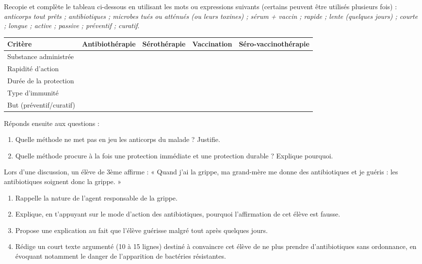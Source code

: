 \documentclass[11pt]{article}
\begin{document}
\begin{exercice}
Recopie et complète le tableau ci-dessous en utilisant les mots ou expressions suivants (certains peuvent être utilisés plusieurs fois) : \emph{anticorps tout prêts ; antibiotiques ; microbes tués ou atténués (ou leurs toxines) ; sérum + vaccin ; rapide ; lente (quelques jours) ; courte ; longue ; active ; passive ; préventif ; curatif}.
\begin{center}
\begin{tabularx}{\linewidth}{|l|X|X|X|X|}
\hline
\rowcolor{popblueL} Critère & Antibiothérapie & Sérothérapie & Vaccination & Séro-vaccinothérapie \\
\hline
Substance administrée & & & & \\
\hline
Rapidité d'action & & & & \\
\hline
Durée de la protection & & & & \\
\hline
Type d'immunité & & & & \\
\hline
But (préventif/curatif) & & & & \\
\hline
\end{tabularx}
\end{center}
Réponds ensuite aux questions :
\begin{enumerate}
\item Quelle méthode ne met pas en jeu les anticorps du malade ? Justifie.
\item Quelle méthode procure à la fois une protection immédiate et une protection durable ? Explique pourquoi.
\end{enumerate}
\end{exercice}

\begin{exercice}
Lors d'une discussion, un élève de 3ème affirme : « Quand j'ai la grippe, ma grand-mère me donne des antibiotiques et je guéris : les antibiotiques soignent donc la grippe. »
\begin{enumerate}
\item Rappelle la nature de l'agent responsable de la grippe.
\item Explique, en t'appuyant sur le mode d'action des antibiotiques, pourquoi l'affirmation de cet élève est fausse.
\item Propose une explication au fait que l'élève guérisse malgré tout après quelques jours.
\item Rédige un court texte argumenté (10 à 15 lignes) destiné à convaincre cet élève de ne plus prendre d'antibiotiques sans ordonnance, en évoquant notamment le danger de l'apparition de bactéries résistantes.
\end{enumerate}
\end{exercice}
\end{document}
